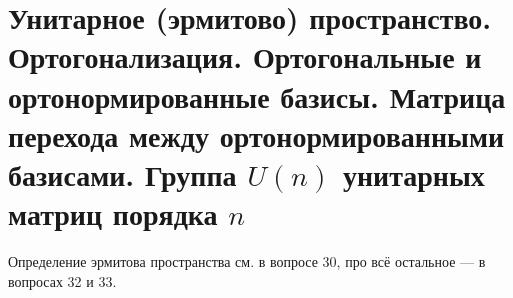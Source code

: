 \section{Унитарное (эрмитово) пространство. Ортогонализация. Ортогональные и ортонормированные базисы. Матрица перехода между ортонормированными базисами. Группа $U(n)$ унитарных матриц порядка $n$}

Определение эрмитова пространства см. в вопросе 30, про всё остальное --- в вопросах 32 и 33.

